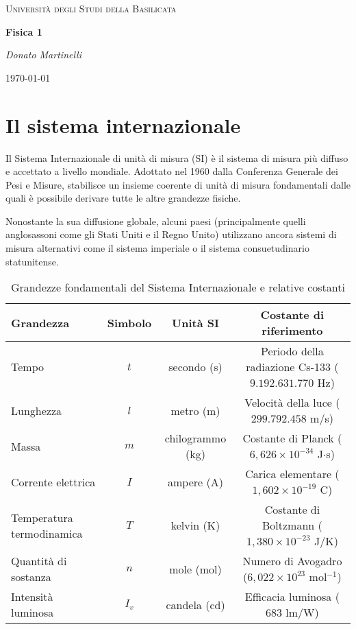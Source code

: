 \documentclass[a4paper,12pt]{article}
\theoremstyle{plain}
\theoremstyle{definition}
\theoremstyle{remark}
\begin{document}
\begin{titlepage}
    \centering
    {\textsc{Università degli Studi della Basilicata} \par}
    \vspace{2cm}
    {\huge\bfseries Fisica 1\par}
    
    \vfill
    {\Large\itshape Donato Martinelli\par}
    {\large \today\par}
\end{titlepage}

\tableofcontents


\section{Il sistema internazionale}

Il Sistema Internazionale di unità di misura (SI) è il sistema di misura più diffuso e accettato a livello mondiale. Adottato nel 1960 dalla Conferenza Generale dei Pesi e Misure, stabilisce un insieme 
coerente di unità di misura fondamentali dalle quali è possibile derivare tutte le altre grandezze fisiche.

Nonostante la sua diffusione globale, alcuni paesi (principalmente quelli anglosassoni come gli Stati Uniti e il Regno Unito) utilizzano ancora sistemi di misura alternativi come il sistema 
imperiale o il sistema consuetudinario statunitense.

\begin{table}[H]
\centering
\begin{tabular}{|l|c|c|c|}
\hline
\textbf{Grandezza} & \textbf{Simbolo} & \textbf{Unità SI} & \textbf{Costante di riferimento} \\
\hline
Tempo & $t$ & secondo (s) & Periodo della radiazione Cs-133 ($9.192.631.770$ Hz) \\
Lunghezza & $l$ & metro (m) & Velocità della luce ($299.792.458$ m/s) \\
Massa & $m$ & chilogrammo (kg) & Costante di Planck ($6,626 \times 10^{-34}$ J$\cdot$s) \\
Corrente elettrica & $I$ & ampere (A) & Carica elementare ($1,602 \times 10^{-19}$ C) \\
Temperatura termodinamica & $T$ & kelvin (K) & Costante di Boltzmann ($1,380 \times 10^{-23}$ J/K) \\
Quantità di sostanza & $n$ & mole (mol) & Numero di Avogadro ($6,022 \times 10^{23}$ mol$^{-1}$) \\
Intensità luminosa & $I_v$ & candela (cd) & Efficacia luminosa ($683$ lm/W) \\
\hline
\end{tabular}
\caption{Grandezze fondamentali del Sistema Internazionale e relative costanti}
\label{tab:si_units}
\end{table}
\end{document}
